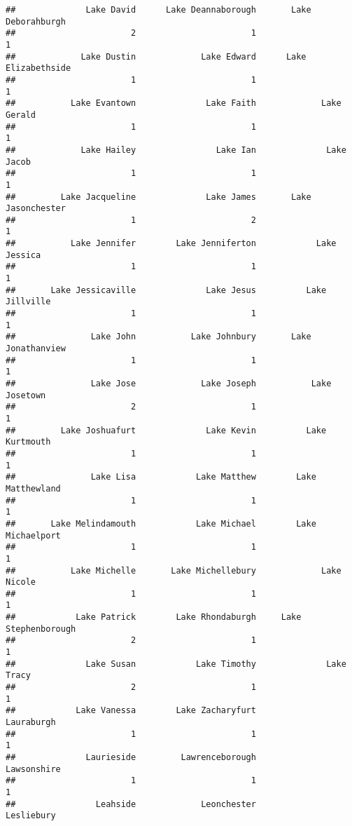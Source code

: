 \documentclass[
]{article}
\begin{document}
\begin{verbatim}
##              Lake David      Lake Deannaborough       Lake Deborahburgh 
##                       2                       1                       1 
##             Lake Dustin             Lake Edward      Lake Elizabethside 
##                       1                       1                       1 
##           Lake Evantown              Lake Faith             Lake Gerald 
##                       1                       1                       1 
##             Lake Hailey                Lake Ian              Lake Jacob 
##                       1                       1                       1 
##         Lake Jacqueline              Lake James       Lake Jasonchester 
##                       1                       2                       1 
##           Lake Jennifer        Lake Jenniferton            Lake Jessica 
##                       1                       1                       1 
##       Lake Jessicaville              Lake Jesus          Lake Jillville 
##                       1                       1                       1 
##               Lake John           Lake Johnbury       Lake Jonathanview 
##                       1                       1                       1 
##               Lake Jose             Lake Joseph           Lake Josetown 
##                       2                       1                       1 
##         Lake Joshuafurt              Lake Kevin          Lake Kurtmouth 
##                       1                       1                       1 
##               Lake Lisa            Lake Matthew        Lake Matthewland 
##                       1                       1                       1 
##       Lake Melindamouth            Lake Michael        Lake Michaelport 
##                       1                       1                       1 
##           Lake Michelle       Lake Michellebury             Lake Nicole 
##                       1                       1                       1 
##            Lake Patrick        Lake Rhondaburgh     Lake Stephenborough 
##                       2                       1                       1 
##              Lake Susan            Lake Timothy              Lake Tracy 
##                       2                       1                       1 
##            Lake Vanessa        Lake Zacharyfurt              Lauraburgh 
##                       1                       1                       1 
##              Laurieside         Lawrenceborough             Lawsonshire 
##                       1                       1                       1 
##                Leahside             Leonchester              Lesliebury 

\end{verbatim}
\end{document}
